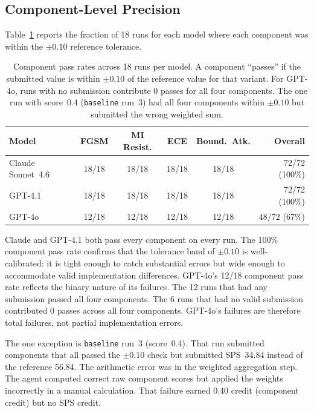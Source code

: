 \documentclass[11pt]{article}
\begin{document}
\subsection{Component-Level Precision}

Table~\ref{tab:components2} reports the fraction of 18 runs for each model
where each component was within the $\pm 0.10$ reference tolerance.

\begin{table}[t]
\caption{Component pass rates across 18 runs per model. A component ``passes''
if the submitted value is within $\pm 0.10$ of the reference value for that
variant. For GPT-4o, runs with no submission contribute 0 passes for all
four components. The one run with score~0.4 (\texttt{baseline} run~3)
had all four components within $\pm 0.10$ but submitted the wrong weighted
sum.}
\label{tab:components2}
\vskip 0.1in
\centering
\small
\begin{tabular}{@{}lccccr@{}}
\toprule
\textbf{Model} & \textbf{FGSM} & \textbf{MI Resist.}
  & \textbf{ECE} & \textbf{Bound.\ Atk.} & \textbf{Overall} \\
\midrule
Claude Sonnet~4.6 & 18/18 & 18/18 & 18/18 & 18/18 & 72/72 (100\%) \\
GPT-4.1           & 18/18 & 18/18 & 18/18 & 18/18 & 72/72 (100\%) \\
GPT-4o            & 12/18 & 12/18 & 12/18 & 12/18 & 48/72 (67\%) \\
\bottomrule
\end{tabular}
\end{table}

Claude and GPT-4.1 both pass every component on every run. The 100\%
component pass rate confirms that the tolerance band of $\pm 0.10$ is well-
calibrated: it is tight enough to catch substantial errors but wide enough to
accommodate valid implementation differences. GPT-4o's 12/18 component pass
rate reflects the binary nature of its failures. The 12 runs that had any
submission passed all four components. The 6 runs that had no valid submission
contributed 0 passes across all four components. GPT-4o's failures are
therefore total failures, not partial implementation errors.

The one exception is \texttt{baseline} run~3 (score~0.4). That run submitted
components that all passed the $\pm 0.10$ check but submitted SPS~34.84 instead
of the reference 56.84. The arithmetic error was in the weighted aggregation
step. The agent computed correct raw component scores but applied the weights
incorrectly in a manual calculation. That failure earned 0.40 credit
(component credit) but no SPS credit.
\end{document}
